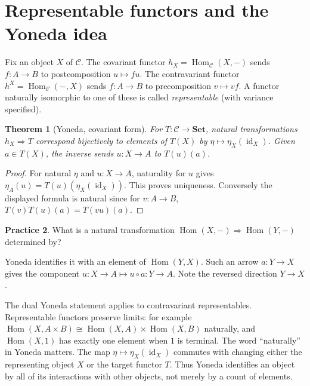 \documentclass[11pt,openany]{book}
\newcommand{\id}{\operatorname{id}}\newcommand{\Sym}{\operatorname{Sym}}
\newcommand{\Hom}{\operatorname{Hom}}\newcommand{\Aut}{\operatorname{Aut}}
\newtheorem{theorem}{Theorem}[chapter]
\theoremstyle{definition}
\newtheorem{exercise}[theorem]{Practice}
\begin{document}
\section{Representable functors and the Yoneda idea}
Fix an object $X$ of $\mathcal C$. The covariant functor $h_X=\Hom_{\mathcal C}(X,-)$ sends $f:A\to B$ to postcomposition $u\mapsto fu$. The contravariant functor $h^X=\Hom_{\mathcal C}(-,X)$ sends $f:A\to B$ to precomposition $v\mapsto vf$. A functor naturally isomorphic to one of these is called \emph{representable} (with variance specified).
\begin{theorem}[Yoneda, covariant form]For $T:\mathcal C\to\mathbf{Set}$, natural transformations $h_X\Rightarrow T$ correspond bijectively to elements of $T(X)$ by $\eta\mapsto\eta_X(\id_X)$. Given $a\in T(X)$, the inverse sends $u:X\to A$ to $T(u)(a)$.\end{theorem}
\begin{proof}For natural $\eta$ and $u:X\to A$, naturality for $u$ gives $\eta_A(u)=T(u)(\eta_X(\id_X))$. This proves uniqueness. Conversely the displayed formula is natural since for $v:A\to B$, $T(v)T(u)(a)=T(vu)(a)$.\end{proof}
\begin{exercise}What is a natural transformation $\Hom(X,-)\Rightarrow\Hom(Y,-)$ determined by?\end{exercise}
\begin{solution}Yoneda identifies it with an element of $\Hom(Y,X)$. Such an arrow $a:Y\to X$ gives the component $u:X\to A\mapsto u\circ a:Y\to A$. Note the reversed direction $Y\to X$.\end{solution}
The dual Yoneda statement applies to contravariant representables. Representable functors preserve limits: for example $\Hom(X,A\times B)\cong\Hom(X,A)\times\Hom(X,B)$ naturally, and $\Hom(X,1)$ has exactly one element when $1$ is terminal.
The word ``naturally'' in Yoneda matters. The map $\eta\mapsto\eta_X(\id_X)$ commutes with changing either the representing object $X$ or the target functor $T$. Thus Yoneda identifies an object by all of its interactions with other objects, not merely by a count of elements.
\end{document}
